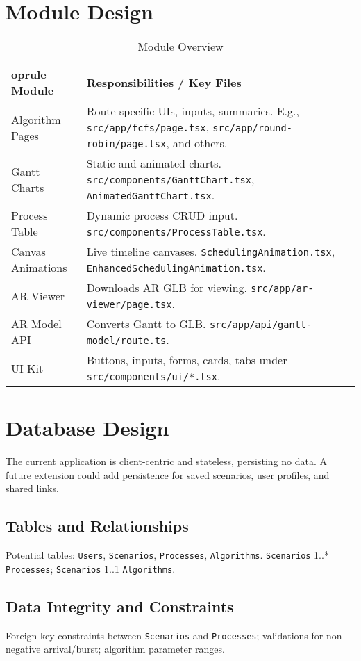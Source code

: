\documentclass[12pt,a4paper,oneside]{report}
\begin{document}
\section{Module Design}
\begin{table}[H]
  \centering
  \caption{Module Overview}
  \begin{tabular}{p{} p{}}
    	oprule
    Module & Responsibilities / Key Files \\
    \midrule
    Algorithm Pages & Route-specific UIs, inputs, summaries. E.g., \verb|src/app/fcfs/page.tsx|, \verb|src/app/round-robin/page.tsx|, and others. \\
    Gantt Charts & Static and animated charts. \verb|src/components/GanttChart.tsx|, \verb|AnimatedGanttChart.tsx|. \\
    Process Table & Dynamic process CRUD input. \verb|src/components/ProcessTable.tsx|. \\
    Canvas Animations & Live timeline canvases. \verb|SchedulingAnimation.tsx|, \verb|EnhancedSchedulingAnimation.tsx|. \\
    AR Viewer & Downloads AR GLB for viewing. \verb|src/app/ar-viewer/page.tsx|. \\
    AR Model API & Converts Gantt to GLB. \verb|src/app/api/gantt-model/route.ts|. \\
    UI Kit & Buttons, inputs, forms, cards, tabs under \verb|src/components/ui/*.tsx|. \\
    \bottomrule
  \end{tabular}
\end{table}

\section{Database Design}
The current application is client-centric and stateless, persisting no data. A future extension could add persistence for saved scenarios, user profiles, and shared links.
\subsection{Tables and Relationships}
Potential tables: \texttt{Users}, \texttt{Scenarios}, \texttt{Processes}, \texttt{Algorithms}. \texttt{Scenarios} 1..* \texttt{Processes}; \texttt{Scenarios} 1..1 \texttt{Algorithms}.
\subsection{Data Integrity and Constraints}
Foreign key constraints between \texttt{Scenarios} and \texttt{Processes}; validations for non-negative arrival/burst; algorithm parameter ranges.
\end{document}
